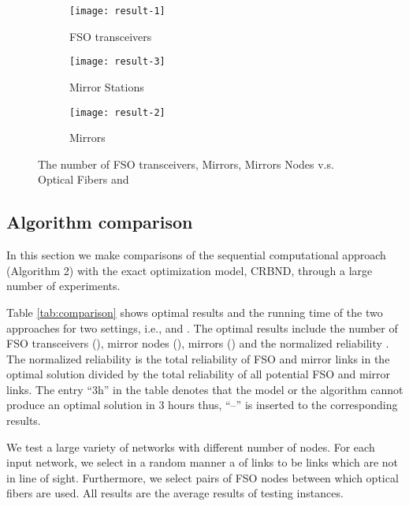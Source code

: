 \documentclass[onecolumn,11pt,draftclsnofoot]{IEEEtran}
\begin{document}
\begin{figure}[!hbtp]
        \centering
        \begin{subfigure}[b]{0.32\textwidth}
                \centering
                \texttt{[image: result-1]}
                \caption{FSO transceivers}
                \label{fig:fso}
        \end{subfigure}
        \begin{subfigure}[b]{0.32\textwidth}
                \centering
                \texttt{[image: result-3]}
                \caption{Mirror Stations}
                \label{fig:mirrorNodes}
        \end{subfigure}
        \begin{subfigure}[b]{0.32\textwidth}
                \centering
                \texttt{[image: result-2]}
                \caption{Mirrors}
                \label{fig:mirrorNum}
        \end{subfigure}
        \caption{The number of FSO transceivers, Mirrors, Mirrors Nodes v.s. Optical Fibers and }\label{fig:cost}
\end{figure}

\subsection{Algorithm comparison}
In this section we make comparisons of the sequential computational approach (Algorithm 2) with the exact optimization model, CRBND, through a large number of experiments.

Table \ref{tab:comparison} shows optimal results and the running time of the two approaches for two settings, i.e.,  and . The optimal results include the number of FSO transceivers (), mirror nodes (), mirrors () and the normalized reliability . The normalized reliability is the total reliability of FSO and mirror links in the optimal solution divided by the total reliability of all potential FSO and mirror links. The entry ``3h'' in the table denotes that the model or the algorithm cannot produce an optimal solution in 3 hours thus, ``--'' is inserted to the corresponding results.

We test a large variety of networks with different number of nodes. For each input network, we select in a random manner a  of links to be links which are not in line of sight. Furthermore, we select  pairs of FSO nodes between which optical fibers are used. All results are the average results of testing  instances.
\end{document}

